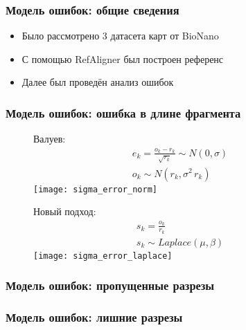 \begin{frame}
\frametitle{Модель ошибок: общие сведения}
\begin{itemize}
  \item Было рассмотрено 3 датасета карт от BioNano
  \item С помощью RefAligner был построен референс
  \item Далее был проведён анализ ошибок
\end{itemize}
\end{frame}

\begin{frame}
\frametitle{Модель ошибок: ошибка в длине фрагмента}


\begin{figure}
\centering
\begin{minipage}{.5\textwidth}
  Валуев:
  \begin{gather*}
  e_k = \frac{o_k - r_k}{\sqrt{r_k}} \sim N(0, \sigma) \\
  o_k \sim N(r_k, \sigma^2 \, r_k)
  \end{gather*}
  \centering
  \texttt{[image: sigma\_error\_norm]}
\end{minipage}%
\begin{minipage}{.5\textwidth}
  Новый подход:
  \begin{gather*}
  s_k = \frac{o_k}{r_k} \\
  s_k \sim Laplace(\mu, \beta)
  \end{gather*}
  \centering
  \texttt{[image: sigma\_error\_laplace]}
\end{minipage}
\end{figure}
\end{frame}

\begin{frame}
\frametitle{Модель ошибок: пропущенные разрезы}

\end{frame}

\begin{frame}
\frametitle{Модель ошибок: лишние разрезы}

\end{frame}
